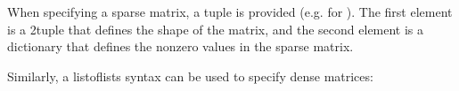 \documentclass[letterpaper,10pt,english]{sphinxmanual}
\begin{document}
\begin{sphinxVerbatim}[commandchars=\\\{\}]
  \PYG{p}{[}   \PYG{p}{]}

   
     

\PYG{p}{[}\PYG{p}{]}
\PYG{p}{[}\PYG{p}{]}
\end{sphinxVerbatim}

When specifying a sparse matrix, a tuple is provided (e.g. for
).  The first element is a 2\sphinxhyphen{}tuple that defines the shape
of the matrix, and the second element is a dictionary that defines the
non\sphinxhyphen{}zero values in the sparse matrix.

Similarly, a list\sphinxhyphen{}of\sphinxhyphen{}lists syntax can be used to specify dense matrices:
\end{document}
